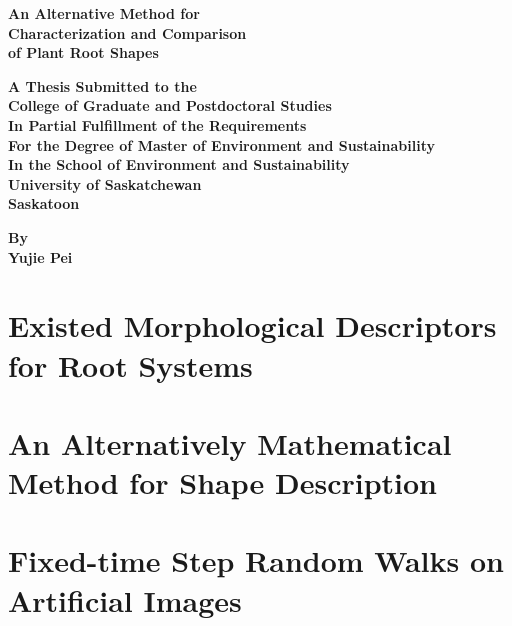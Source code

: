 \documentclass[12pt]{report}
\numberwithin{equation}{chapter}
\begin{document}
\begin{titlepage}
  \begin{center}
    \vspace{1.5cm}
    \huge
    \textbf{An Alternative Method for \\
      Characterization and Comparison \\
      of Plant Root Shapes}
    \par
    \vspace{1.5cm}
    \large
    \textbf{A Thesis Submitted to the \\
      College of Graduate and Postdoctoral Studies \\
      In Partial Fulfillment of the Requirements \\
      For the Degree of Master of Environment and Sustainability \\
      In the School of Environment and Sustainability \\
      University of Saskatchewan\\
      Saskatoon}

    \vspace{3cm}
    \textbf{By}\\
    \vspace{1cm}
    \textbf{Yujie Pei}\\
    \vspace{1cm}
    \vfill
  \end{center}
\end{titlepage}


\tableofcontents

\chapter{Existed Morphological Descriptors for Root Systems}


\chapter{An Alternatively Mathematical Method for Shape Description}





\chapter{Fixed-time Step Random Walks on Artificial Images}




\newpage
\printbibliography
\end{document}
